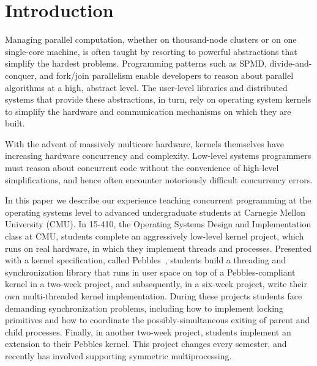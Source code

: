 \section{Introduction}

Managing parallel computation, whether on thousand-node clusters or on one single-core machine, is often taught by resorting to powerful abstractions that simplify the hardest problems.
Programming patterns such as SPMD, divide-and-conquer, and fork/join parallelism enable developers to reason about parallel algorithms at a high, abstract level.
The user-level libraries and distributed systems that provide these abstractions, in turn, rely on operating system kernels to simplify the hardware and communication mechanisms on which they are built. %

With the advent of massively multicore hardware,
kernels themselves have increasing hardware concurrency and complexity. %
Low-level systems programmers must reason about concurrent code without the convenience of high-level simplifications, and hence often encounter notoriously difficult concurrency errors.

In this paper we describe our experience teaching concurrent programming at the operating systems level to advanced undergraduate students at Carnegie Mellon University (CMU).
In 15-410, the Operating Systems Design and Implementation class at CMU, students complete an aggressively low-level kernel project, which runs on real hardware, in which they implement threads and processes.
Presented with a kernel specification, called Pebbles~\cite{kspec}, students build a threading and synchronization library that runs in user space on top of a Pebbles-compliant kernel in a two-week project, and subsequently, in a six-week project, write their own multi-threaded kernel implementation.
During these projects students face demanding synchronization problems, including how to implement locking primitives and how to coordinate the possibly-simultaneous exiting of parent and child processes.
Finally, in another two-week project, students implement an extension to their Pebbles kernel. This project changes every semester, and recently has involved supporting symmetric multiprocessing.

